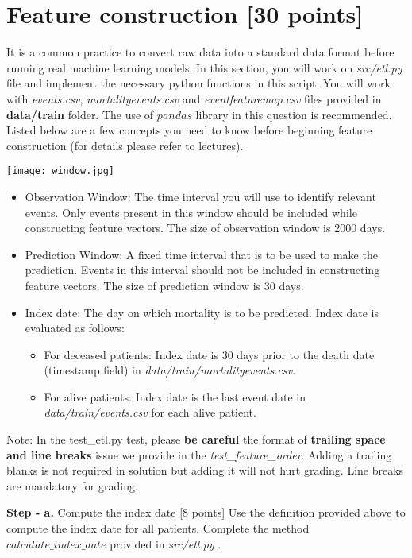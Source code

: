\documentclass[12pt]{article}
\begin{document}
\section{Feature construction [30 points] }
It is a common practice to convert raw data into a standard data format before running real machine learning models. In this section, you will work on \textit{src/etl.py} file and implement the necessary python functions in this script. You will work with \textit{events.csv}, \textit{mortality\textunderscore events.csv} and \textit{event\textunderscore feature\textunderscore map.csv} files provided in \textbf{data/train} folder.  The use of $pandas$ library in this question is recommended. 
Listed below are a few concepts you need to know before beginning feature construction (for details please refer to lectures). 
\begin{center}
\texttt{[image: window.jpg]}
\end{center}
\begin{itemize}
\item Observation Window: The time interval you will use to identify relevant events. Only events present in this window should be included while constructing  feature vectors. The size of observation window is 2000 days. 
\item Prediction Window: A fixed time interval that is to be used to make the prediction. Events in this interval should not be included in constructing feature vectors. The size of prediction window is 30 days. 
\item Index date: The day on which mortality is to be predicted. Index date is evaluated as follows:
\begin{itemize}
\item For deceased patients: Index date is 30 days prior to the death date (timestamp field) in \textit{data/train/mortality\textunderscore events.csv}. 
\item For alive patients: Index date is the last event date in \textit{data/train/events.csv} for each alive patient. 

\end{itemize}
\end{itemize}
Note: In the test\_etl.py test, please \textbf{be careful} the format of \textbf{trailing space and line breaks} issue we provide in the \textit{test\_feature\_order}. Adding a trailing blanks is not required in solution but adding it will not hurt grading. Line breaks are mandatory for grading. 

\textbf{Step - a.} Compute the index date [8 points]
\newline
Use the definition provided above to compute the index date for all patients. Complete the method \textit{$calculate\_index\_date$} provided in \textit{src/etl.py} . 
\newline
\end{document}

